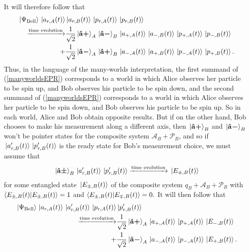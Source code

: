 \vspace{\alignstarspace pt}\newline
It will therefore follow that 
\begin{equation}\label{manyworldsEPR}
  \begin{split}\ket*{\Psi_{\text{Bell}}}\ket*{a_{r,A}(t)}&\ket*{a_{r,B}(t)}\ket*{p_{r, A}(t)}\ket*{p_{r, B}(t)}\\ 
    \xrightarrow{\text{time evolution}}&\frac{1}{\sqrt{2}}\ket*{{\vb{\hat{{a}}}\bm{+}}}_A\ket*{{\vb{\hat{{a}}}\bm{-}}}_B\ket*{a_{+,A}(t)}\ket*{a_{-,B}(t)}\ket*{p_{+, A}(t)}\ket*{p_{-, B}(t)}\\
  +& \frac{1}{\sqrt{2}}\ket*{{\vb{\hat{{a}}}\bm{-}}}_A\ket*{{\vb{\hat{{a}}}\bm{+}}}_B\ket*{a_{-,A}(t)}\ket*{a_{+,B}(t)}\ket*{p_{-, A}(t)}\ket*{p_{+, B}(t)}.\end{split}
\end{equation}
Thus, in the language of the many-worlds interpretation, the first summand of (\ref{manyworldsEPR}) corresponds to a world in which Alice observes her particle to be spin up, and Bob observes his particle to be spin down, and the second summand of (\ref{manyworldsEPR}) corresponds to a world in which Alice observes her particle to be spin down, and Bob observes his particle to be spin up. So in each world, Alice and Bob obtain opposite results. But if on the other hand, Bob chooses to make his measurement along a different axis, then $\ket*{{\vb{\hat{{a}}}\bm{+}}}_B$ and $\ket*{{\vb{\hat{{a}}}\bm{-}}}_B$ won't be pointer states for the composite system $\mathcal{A}_B+\mathcal{P}_B$, and so if   $\ket*{a_{r,B}'(t)}\ket*{p_{r, B}'(t)}$ is the ready state for Bob's measurement choice, we must assume that
\begin{equation*}
\ket*{{\vb{\hat{{a}}}\bm{\pm}}}_B\ket*{a_{r,B}'(t)}\ket*{p_{r, B}'(t)}\xrightarrow{\text{time evolution}}\ket*{E_{\pm,B}(t)}
\end{equation*} 
for some entangled state $\ket*{E_{\pm,B}(t)}$ of the composite system $q_B+\mathcal{A}_B+\mathcal{P}_B$ with $\ip{E_{\pm,B}(t)}{E_{\pm,B}(t)}=1$ and   $\ip{E_{\pm,B}(t)}{E_{\mp,B}(t)}=0.$ It will then follow that 
\begin{equation}\label{manyworldsEPR2}
  \begin{split}\ket*{\Psi_{\text{Bell}}}\ket*{a_{r,A}(t)}\ket*{a_{r,B}'(t)}\ket*{p_{r, A}(t)}&\ket*{p_{r, B}'(t)}\\ 
    \xrightarrow{\text{time evolution}}&\frac{1}{\sqrt{2}}\ket*{{\vb{\hat{{a}}}\bm{+}}}_A\ket*{a_{+,A}(t)}\ket*{p_{+, A}(t)}\ket*{E_{-,B}(t)}\\
  +& \frac{1}{\sqrt{2}}\ket*{{\vb{\hat{{a}}}\bm{-}}}_A\ket*{a_{-,A}(t)}\ket*{p_{-, A}(t)}\ket*{E_{+,B}(t)}.\end{split}
\end{equation}
